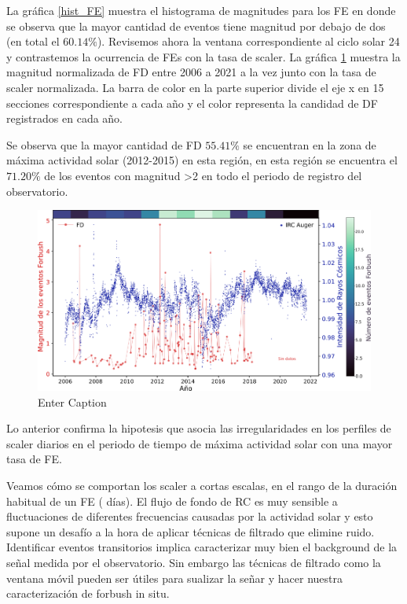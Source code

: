 

La gráfica \ref{hist_FE} muestra el histograma de magnitudes para los FE en donde se observa que la mayor cantidad de eventos tiene magnitud por debajo de dos (en total el $60.14\%$). Revisemos ahora la ventana correspondiente al ciclo solar 24 y contrastemos la ocurrencia de FEs con la tasa de scaler. La gráfica \ref{fig:FD_scaler} muestra la magnitud normalizada de FD entre 2006 a 2021 a la vez junto con la tasa de scaler normalizada. La barra de color en la parte superior divide el eje x en 15 secciones correspondiente a cada año  y el color representa la candidad de DF registrados en cada año.

Se observa  que la mayor cantidad de FD $55.41\%$ se encuentran en la zona de máxima actividad solar (2012-2015) en esta región, en esta región se encuentra el $71.20\%$ de los eventos con magnitud >2 en todo el periodo de registro del observatorio.
\begin{figure}
    \includegraphics[width=1\linewidth]{Figs/Figr/FD_Scaler_AUGER.png}
    \caption{Enter Caption}
    \label{fig:FD_scaler}
\end{figure}
Lo anterior confirma la hipotesis que asocia las irregularidades en los perfiles de scaler diarios en el periodo de tiempo de máxima actividad solar con una mayor tasa de FE.

Veamos cómo se comportan los scaler a cortas escalas, en el rango de la duración habitual de un FE (
días). El flujo de fondo de RC es muy sensible a fluctuaciones de diferentes frecuencias causadas por la actividad solar y esto supone un desafío a la hora de aplicar técnicas de filtrado que elimine ruido. Identificar eventos transitorios implica caracterizar muy bien el background de la señal medida por el observatorio. Sin embargo las técnicas de filtrado como la ventana móvil pueden ser útiles para sualizar la señar y hacer nuestra caracterización de forbush in situ. 

